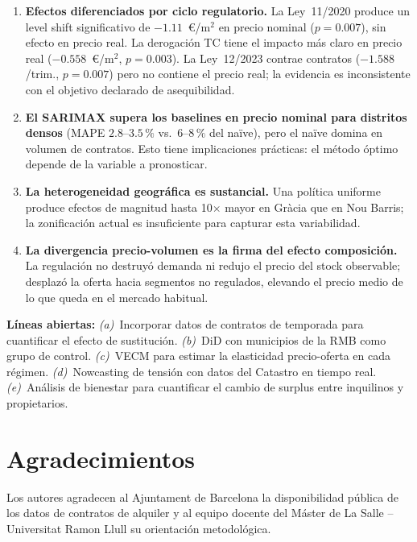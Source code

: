 \documentclass[10pt,a4paper,twocolumn]{article}
\begin{document}
\begin{enumerate}[leftmargin=*,label=\textbf{C\arabic*.}]

\item \textbf{Efectos diferenciados por ciclo regulatorio.} La Ley~11/2020 produce
un level shift significativo de $-1.11$~\euro/m$^2$ en precio nominal ($p{=}0.007$),
sin efecto en precio real. La derogación TC tiene el impacto más claro en precio real
($-0.558$~\euro/m$^2$, $p{=}0.003$). La Ley~12/2023 contrae contratos
($-1.588$/trim., $p{=}0.007$) pero no contiene el precio real; la evidencia es
inconsistente con el objetivo declarado de asequibilidad.

\item \textbf{El SARIMAX supera los baselines en precio nominal para distritos densos}
(MAPE $2.8$--$3.5\,\%$ vs.\ $6$--$8\,\%$ del naïve), pero el naïve domina en volumen
de contratos. Esto tiene implicaciones prácticas: el método óptimo depende de la
variable a pronosticar.

\item \textbf{La heterogeneidad geográfica es sustancial.} Una política uniforme
produce efectos de magnitud hasta 10$\times$ mayor en Gràcia que en Nou Barris;
la zonificación actual es insuficiente para capturar esta variabilidad.

\item \textbf{La divergencia precio-volumen es la firma del efecto composición.}
La regulación no destruyó demanda ni redujo el precio del stock observable; desplazó
la oferta hacia segmentos no regulados, elevando el precio medio de lo que queda en
el mercado habitual.

\end{enumerate}

\textbf{Líneas abiertas:} \textit{(a)}~Incorporar datos de contratos de temporada
para cuantificar el efecto de sustitución. \textit{(b)}~DiD con municipios de la
RMB como grupo de control. \textit{(c)}~VECM para estimar la elasticidad precio-oferta
en cada régimen. \textit{(d)}~Nowcasting de tensión con datos del Catastro en tiempo
real. \textit{(e)}~Análisis de bienestar para cuantificar el cambio de surplus entre
inquilinos y propietarios.

\section*{Agradecimientos}

Los autores agradecen al Ajuntament de Barcelona la disponibilidad pública de los
datos de contratos de alquiler y al equipo docente del Máster de La Salle --
Universitat Ramon Llull su orientación metodológica.
\end{document}
